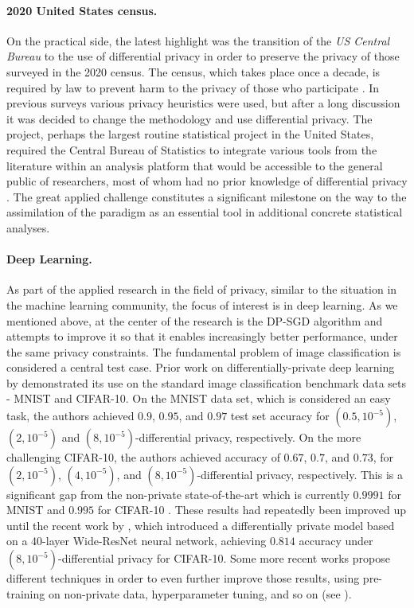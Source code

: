 \documentclass[12pt,a4paper,oneside,onecolumn]{book}
\begin{document}
\paragraph{2020 United States census.}
On the practical side, the latest highlight was the transition of the \emph{US Central Bureau} to the use of differential privacy in order to preserve the privacy of those surveyed in the 2020 census. The census, which takes place once a decade, is required by law to prevent harm to the privacy of those who participate \citep{bureau_2021c}. 
In previous surveys various privacy heuristics were used, but after a long discussion it was decided to change the methodology and use differential privacy. 
The project, perhaps the largest routine statistical project in the United States, required the Central Bureau of Statistics to integrate various tools from the literature within an analysis platform that would be accessible to the general public of researchers, most of whom had no prior knowledge of differential privacy \citep{bureau_2021b}. 
The great applied challenge constitutes a significant milestone on the way to the assimilation of the paradigm as an essential tool in additional concrete statistical analyses.

\paragraph{Deep Learning.}
As part of the applied research in the field of privacy, similar to the situation in the machine learning community, the focus of interest is in deep learning. 
As we mentioned above, at the center of the research is the DP-SGD algorithm and attempts to improve it so that it enables increasingly better performance, under the same privacy constraints. 
The fundamental problem of image classification is considered a central test case. Prior work on differentially-private deep learning by \citet{Abadi_2016} demonstrated its use on the standard image classification benchmark data sets - MNIST and CIFAR-10. On the MNIST data set, which is considered an easy task, the authors  achieved $0.9$, $0.95$, and $0.97$ test set accuracy for $(0.5, 10^{-5})$, $(2, 10^{-5})$ and $(8, 10^{-5})$-differential privacy, respectively. 
On the more challenging CIFAR-10, the authors  achieved accuracy of $0.67$, $0.7$, and $0.73$,  for $(2, 10^{-5})$, $(4, 10^{-5})$, and $(8, 10^{-5})$-differential privacy, respectively. 
This is a significant gap from the non-private state-of-the-art which is currently $0.9991$ for MNIST and  $0.995$ for CIFAR-10 \citep{https://doi.org/10.48550/arxiv.2008.10400, DBLP:journals/corr/abs-2010-11929}. 
These results had repeatedly been improved up until the recent work by \citet{jax-privacy2022github}, which introduced a differentially private model based on a 40-layer Wide-ResNet neural network, achieving $0.814$ accuracy under $(8, 10^{-5})$-differential privacy for CIFAR-10. 
Some more recent works propose different techniques in order to even further improve those results, using pre-training on non-private data, hyperparameter tuning, and so on (see \citet{DBLP:journals/corr/abs-2201-12328}).
\end{document}
